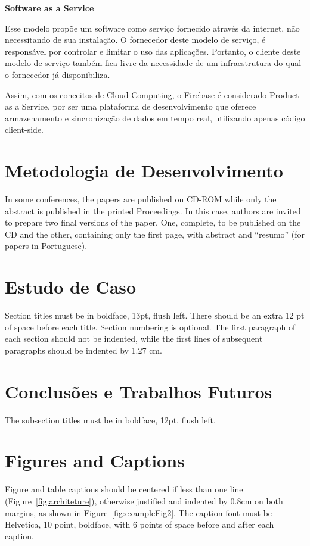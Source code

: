 \documentclass[12pt]{article}
\begin{document}
\textbf{Software as a Service}

Esse modelo propõe um software como serviço fornecido através da internet, não necessitando de sua instalação. O fornecedor deste modelo de serviço, é responsável por controlar e limitar o uso das aplicações. Portanto, o cliente deste modelo de serviço também fica livre da necessidade de um infraestrutura do qual o fornecedor já disponibiliza.

Assim, com os conceitos de Cloud Computing, o Firebase é considerado Product as a Service, por ser uma plataforma de desenvolvimento que oferece armazenamento e sincronização de dados em tempo real, utilizando apenas código client-side.

\section{Metodologia de Desenvolvimento}

In some conferences, the papers are published on CD-ROM while only the
abstract is published in the printed Proceedings. In this case, authors are
invited to prepare two final versions of the paper. One, complete, to be
published on the CD and the other, containing only the first page, with
abstract and ``resumo'' (for papers in Portuguese).

\section{Estudo de Caso}

Section titles must be in boldface, 13pt, flush left. There should be an extra
12 pt of space before each title. Section numbering is optional. The first
paragraph of each section should not be indented, while the first lines of
subsequent paragraphs should be indented by 1.27 cm.

\section{Conclusões e Trabalhos Futuros}

The subsection titles must be in boldface, 12pt, flush left.

\section{Figures and Captions}\label{sec:figs}


Figure and table captions should be centered if less than one line
(Figure~\ref{fig:architeture}), otherwise justified and indented by 0.8cm on
both margins, as shown in Figure~\ref{fig:exampleFig2}. The caption font must
be Helvetica, 10 point, boldface, with 6 points of space before and after each
caption.
\end{document}
